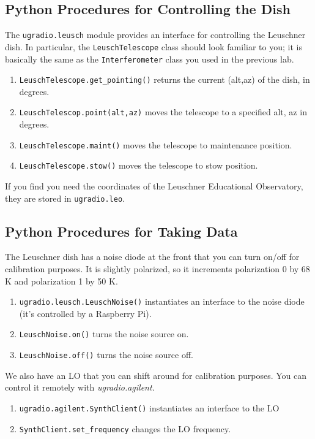 \documentclass[psfig,preprint]{aastex}
\begin{document}
\subsection{Python Procedures for Controlling the Dish}

\noindent
The {\tt ugradio.leusch} module provides an interface for controlling
the Leuschner dish.  In particular, the {\tt LeuschTelescope} class should
look familiar to you; it is basically the same as the {\tt Interferometer}
class you used in the previous lab.

\begin{enumerate}
\item {\tt LeuschTelescope.get\_pointing()} returns the current (alt,az) of the dish, in degrees.
\item {\tt LeuschTelescop.point(alt,az)} moves the telescope to a specified alt, az in degrees.
\item {\tt LeuschTelescope.maint()} moves the telescope to maintenance position.
\item {\tt LeuschTelescope.stow()} moves the telescope to stow position.
\end{enumerate}

\noindent
If you find you need the coordinates of the Leuschner Educational Observatory, they are stored in
{\tt ugradio.leo}.

\subsection{Python Procedures for Taking Data}

\noindent
The Leuschner dish has a noise diode at the front that you can turn on/off for
calibration purposes. It is slightly polarized, so it increments 
polarization 0 by 68 K and polarization 1 by 50 K.
\begin{enumerate}
\item {\tt ugradio.leusch.LeuschNoise()} instantiates an interface to the noise diode (it's controlled
by a Raspberry Pi).
\item {\tt LeuschNoise.on()} turns the noise source on.
\item {\tt LeuschNoise.off()} turns the noise source off.
\end{enumerate}

We also have an LO that you can shift around for calibration purposes.
You can control it remotely with {\it ugradio.agilent}. 
\begin{enumerate}
\item {\tt ugradio.agilent.SynthClient()} instantiates an interface to the LO
\item {\tt SynthClient.set\_frequency} changes the LO frequency.
\end{enumerate}
\end{document}
